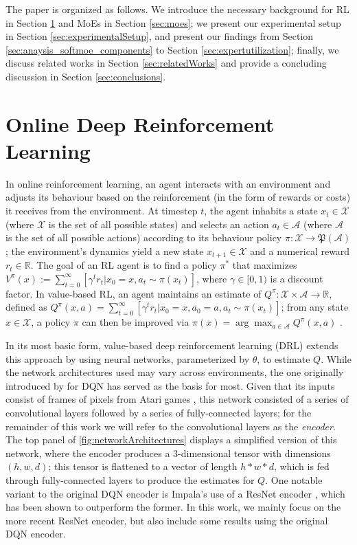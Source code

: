 \documentclass{article} %
\newcommand{\stateSpace}{\mathcal{X}}
\newcommand{\actionSpace}{\mathcal{A}}
\newcommand{\reals}{\mathbb{R}}
\begin{document}
The paper is organized as follows. We introduce the necessary background for RL in Section \ref{sec:rlBackground} and MoEs in Section \ref{sec:moes}; we present our experimental setup in Section \ref{sec:experimentalSetup}, and present our findings from Section \ref{sec:anaysis_softmoe_components} to Section \ref{sec:expertutilization}; finally, we discuss related works in Section \ref{sec:relatedWorks} and provide a concluding discussion in Section \ref{sec:conclusions}.



\section{Online Deep Reinforcement Learning}
\label{sec:rlBackground}
In online reinforcement learning, an agent interacts with an environment and adjusts its behaviour based on the reinforcement (in the form of rewards or costs) it receives from the environment. At timestep $t$, the agent inhabits a state $x_t\in\stateSpace$ (where $\stateSpace$ is the set of all possible states) and selects an action $a_t\in\actionSpace$ (where $\actionSpace$ is the set of all possible actions) according to its behaviour policy $\pi:\stateSpace\rightarrow\mathfrak{P}(\actionSpace)$; the environment's dynamics yield a new state $x_{t+1}\in\stateSpace$ and a numerical reward $r_t\in\reals$. The goal of an RL agent is to find a policy $\pi^*$ that maximizes $V^{\pi}(x) := \sum_{t=0}^{\infty}\left[ \gamma ^t r_t | x_0 = x, a_t\sim\pi(x_t)\right]$, where $\gamma\in [0, 1)$ is a discount factor. In value-based RL, an agent maintains an estimate of $Q^{\pi}:\stateSpace\times\actionSpace\rightarrow\reals$, defined as $Q^{\pi}(x, a) = \sum_{t=0}^{\infty}\left[ \gamma ^t r_t | x_0 = x, a_0 = a, a_t\sim\pi(x_t)\right]$; from any state $x\in\stateSpace$, a policy $\pi$ can then be improved via $\pi(x) = \arg\max_{a\in\actionSpace}Q^{\pi}(x, a)$ \citep{sutton98rl}.


In its most basic form, value-based deep reinforcement learning (DRL) extends this approach by using neural networks, parameterized by $\theta$, to estimate $Q$. While the network architectures used may vary across environments, the one originally introduced by \citet{mnih2015humanlevel} for DQN has served as the basis for most. Given that its inputs consist of frames of pixels from Atari games \citep{bellemare2013arcade}, this network consisted of a series of convolutional layers followed by a series of fully-connected layers; for the remainder of this work we will refer to the convolutional layers as the {\em encoder}. The top panel of \autoref{fig:networkArchitectures} displays a simplified version of this network, where the encoder produces a 3-dimensional tensor with dimensions $(h,w,d)$; this tensor is flattened to a vector of length $h*w*d$, which is fed through fully-connected layers to produce the estimates for $Q$. One notable variant to the original DQN encoder is Impala's use of a ResNet encoder \citep{espeholt2018impala}, which has been shown to outperform the former. In this work, we mainly focus on the more recent ResNet encoder, but also include some results using the original DQN encoder.
\end{document}
